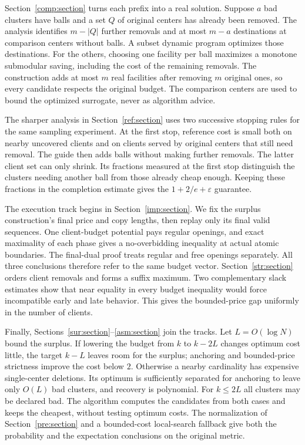 Section~\ref{comp:section} turns each prefix into a real solution.
Suppose $a$ bad clusters have balls and a set $Q$ of original centers has
already been removed.  The analysis identifies $m-|Q|$ further removals and
at most $m-a$ destinations at comparison centers without balls.
A subset dynamic program optimizes those destinations.  For the others,
choosing one facility per ball maximizes a monotone submodular saving,
including the cost of the remaining removals.  The construction adds
at most $m$ real facilities after removing $m$ original ones, so every
candidate respects the original budget.  The comparison centers are
used to bound the optimized surrogate, never as algorithm advice.

The sharper analysis in Section~\ref{ref:section} uses two successive
stopping rules for the same sampling experiment.  At the first stop,
reference cost is small both on nearby uncovered clients and on clients
served by original centers that still need removal.  The guide then
adds balls without making further removals.  The latter client set
can only shrink.  Its fractions measured at the first stop distinguish
the clusters needing another ball from those already cheap enough.
Keeping these fractions in the completion estimate gives the
$1+2/e+\varepsilon$ guarantee.

The execution track begins in Section~\ref{imp:section}.  We fix the
surplus construction's final price and copy lengths, then replay only
its final valid sequences.  One client-budget potential pays regular
openings, and exact maximality of each phase gives a no-overbidding
inequality at actual atomic boundaries.  The final-dual proof treats
regular and free openings separately.  All three conclusions therefore
refer to the same budget vector.  Section~\ref{str:section} orders
client removals and forms a suffix maximum.  Two complementary slack
estimates show that near equality in every budget inequality would
force incompatible early and late behavior.  This gives the bounded-price
gap uniformly in the number of clients.

Finally, Sections~\ref{sur:section}--\ref{asm:section} join the tracks.
Let $L=O(\log N)$ bound the surplus.  If lowering the budget from $k$
to $k-2L$ changes optimum cost little, the target $k-L$ leaves room
for the surplus; anchoring and bounded-price strictness improve the
cost below $2$.  Otherwise a nearby cardinality has expensive
single-center deletions.  Its optimum is sufficiently separated for
anchoring to leave only $O(L)$ bad clusters, and recovery is polynomial.
For $k\le2L$ all clusters may be declared bad.  The algorithm computes
the candidates from both cases and keeps the cheapest, without testing
optimum costs.  The normalization of Section~\ref{pre:section} and a
bounded-cost local-search fallback give both the probability and the
expectation conclusions on the original metric.
